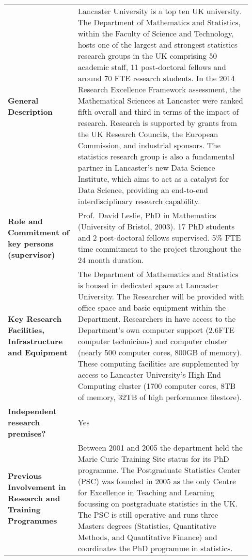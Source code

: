 \documentclass[a4paper,11pt]{article}
\begin{document}
{\fontsize{9bp}{1em}\selectfont %
\noindent\begin{tabular}{>{\raggedright}p{}p{}}
  \multicolumn{2}{l}{\textbf{Beneficiary: Lancaster University}} \\\midrule
\textbf{General Description} & Lancaster University is a top ten UK university.  The Department of Mathematics and Statistics, within the Faculty
of Science and Technology, hosts one of the largest and strongest statistics research groups in the
UK comprising 50 academic staff, 11 post-doctoral fellows and around 70 FTE research students. In the 2014
Research Excellence Framework assessment, the Mathematical Sciences at Lancaster were ranked fifth overall and third in
terms of the impact of research.  Research is supported by grants from the UK Research Councils, the European Commission, and industrial sponsors. The statistics research group is also a fundamental partner in Lancaster's new Data Science Institute, which aims to act as a catalyst for Data Science, providing an end-to-end interdisciplinary research capability. 

\\\midrule
\textbf{Role and Commitment of key persons (supervisor)} &
Prof.\ David Leslie, PhD in Mathematics (University of Bristol, 2003).  17 PhD students and 2 post-doctoral fellows supervised. 5\% FTE time commitment to the project throughout the 24 month duration.
\\\midrule
\textbf{Key Research Facilities, Infrastructure and Equipment} &
The Department of Mathematics and Statistics is housed in dedicated space at Lancaster University.  The Researcher will be provided with office space and basic equipment within the Department. Researchers in have access to the Department's own computer support (2.6FTE computer technicians) and computer cluster (nearly 500 computer cores, 800GB of memory). These computing facilities are supplemented by access to Lancaster University's High-End Computing cluster (1700 computer cores, 8TB of memory, 32TB of high performance filestore).

\\\midrule
\textbf{Independent research premises?} & Yes

\\\midrule
\textbf{Previous Involvement in Research and Training Programmes} &
Between 2001 and 2005 the department held the Marie Curie Training Site status for its PhD programme. The Postgraduate Statistics Center (PSC) was founded in 2005 as the only Centre for Excellence in Teaching and Learning focussing on postgraduate statistics in the UK. The PSC is still operative and runs three Masters degrees (Statistics, Quantitative Methods, and Quantitative Finance) and coordinates the PhD programme in statistics.



\end{tabular}}
\end{document}
